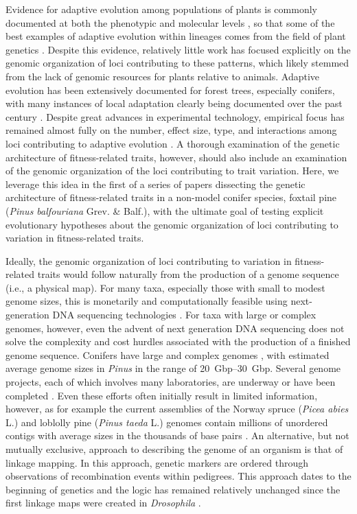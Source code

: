 \documentclass[11pt]{article}
\begin{document}
Evidence for adaptive evolution among populations of plants is commonly documented at both the phenotypic 
and molecular levels \citep{Kawecki:2004, Pannell:2013}, so that some of the best
examples of adaptive evolution within lineages comes from the field of plant genetics \citep[e.g.,][]{Antonovics:1970}. 
Despite this evidence, relatively little work has focused explicitly on the genomic organization of loci contributing
to these patterns\citep{Hoffman:2008}, which likely stemmed from the lack of genomic resources for plants relative to animals.
Adaptive evolution has been extensively documented for forest trees, especially conifers, with many instances of 
local adaptation clearly being documented over the past century \citep{White:2007, Neale:2011}. Despite great advances 
in experimental technology, empirical focus has remained almost fully on the number, effect size, type, and interactions 
among loci contributing to adaptive evolution \citep{Neale:2011, Alberto:2013}.  A thorough examination of the 
genetic architecture of fitness-related traits, however, should also include 
an examination of the genomic organization of the loci contributing to trait variation. Here, we leverage 
this idea in the first of a series of papers dissecting the genetic architecture of fitness-related 
traits in a non-model conifer species, foxtail pine (\textit{Pinus balfouriana} Grev. \& Balf.), with the 
ultimate goal of testing explicit evolutionary hypotheses about the genomic organization of loci 
contributing to variation in fitness-related traits.

Ideally, the genomic organization of loci contributing to variation in fitness-related traits would follow 
naturally from the production of a genome sequence (i.e., a physical map). For many taxa, especially those with 
small to modest genome sizes, this is monetarily and computationally feasible using next-generation DNA sequencing 
technologies \citep{Koboldt:2013}. For taxa with large or complex genomes, however, even the advent of next generation DNA 
sequencing does not solve the complexity and cost hurdles associated with the production of a finished genome sequence. Conifers 
have large and complex genomes \citep{Murray:1998, Ahuja:2005}, with estimated average genome sizes in \textit{Pinus} in the 
range of \SIrange{20}{30}{Gbp}. Several genome projects, each of which involves many laboratories, are underway or have been 
completed \citep{Mackay:2012}. Even these efforts often initially result in limited information, however,
as for example the current assemblies of the Norway spruce (\textit{Picea abies} L.) and loblolly pine (\textit{Pinus taeda} L.) genomes 
contain millions of unordered contigs with average sizes in the thousands of base pairs \citep{Nystedt:2013}. An alternative, 
but not mutually exclusive, approach to describing the genome of an organism 
is that of linkage mapping. In this approach, genetic markers are ordered through observations of recombination events 
within pedigrees. This approach dates to the beginning of genetics and the logic has remained relatively unchanged 
since the first linkage maps were created in \textit{Drosophila} \citep{Sturtevant:1913}.
\end{document}

